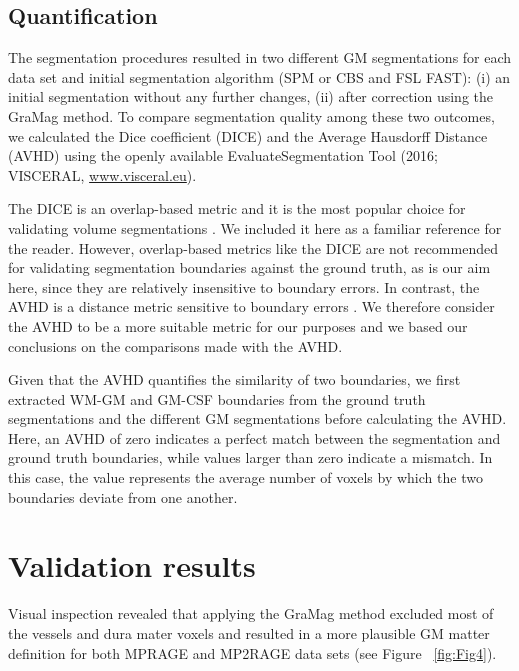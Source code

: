 \subsection{Quantification}
The segmentation procedures resulted in two different GM segmentations for each data set and initial segmentation algorithm (SPM or CBS and FSL FAST): (i) an initial segmentation without any further changes, (ii) after correction using the GraMag method. To compare segmentation quality among these two outcomes, we calculated the Dice coefficient (DICE) and the Average Hausdorff Distance (AVHD) using the openly available EvaluateSegmentation Tool (2016; VISCERAL, \href{http://www.visceral.eu}{www.visceral.eu}).

The DICE is an overlap-based metric and it is the most popular choice for validating volume segmentations \parencite{Taha2015}. We included it here as a familiar reference for the reader. However, overlap-based metrics like the DICE are not recommended for validating segmentation boundaries against the ground truth, as is our aim here, since they are relatively insensitive to boundary errors. In contrast, the AVHD is a distance metric sensitive to boundary errors \parencite{Taha2015}. We therefore consider the AVHD to be a more suitable metric for our purposes and we based our conclusions on the comparisons made with the AVHD. 

Given that the AVHD quantifies the similarity of two boundaries, we first extracted WM-GM and GM-CSF boundaries from the ground truth segmentations and the different GM segmentations before calculating the AVHD. Here, an AVHD of zero indicates a perfect match between the segmentation and ground truth boundaries, while values larger than zero indicate a mismatch. In this case, the value represents the average number of voxels by which the two boundaries deviate from one another.

\section{Validation results}
\label{sec:ValidationResults}
Visual inspection revealed that applying the GraMag method excluded most of the vessels and dura mater voxels and resulted in a more plausible GM matter definition for both MPRAGE and MP2RAGE data sets (see Figure ~\ref{fig:Fig4}).

